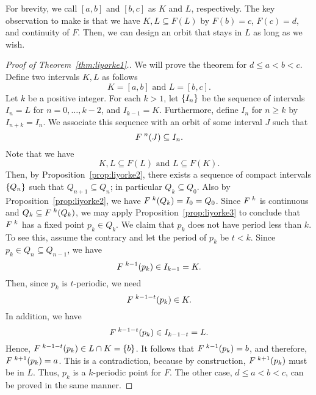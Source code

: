 \documentclass[10pt,draft,twoside]{book}
\begin{document}
For brevity, we call $[a,b]$ and $[b,c]$ as $K$ and $L$, respectively.
The key observation to make is that we have $K,L \subseteq F(L)$ by $F(b) = c$, $F(c) = d$, and continuity of $F$.
Then, we can design an orbit that stays in $L$ as long as we wish.
\begin{proof}[Proof of Theorem~\ref{thm:liyorke1}.]
  We will prove the theorem for $d \leq a < b < c$.
  Define two intervals $K,L$ as follows
  \begin{equation*}
    K = [a,b] \mbox{ and } L = [b,c].
  \end{equation*}
  Let $k$ be a positive integer.
  For each $k > 1$, let $\left \{ I_n \right \}$ be the sequence of intervals $I_n = L$ for $n = 0, \ldots, k-2$, and $I_{k-1} = K$.
  Furthermore, define $I_n$ for $n \geq k$ by $I_{n+k} = I_n$.
  We associate this sequence with an orbit of some interval $J$ such that
  \begin{equation*}
    F^{\;n}(J) \subseteq I_n.
  \end{equation*}
  Note that we have 
  \begin{equation*}
    K,L \subseteq F(L) \mbox{ and } L \subseteq F(K).
  \end{equation*}
  Then, by Proposition~\ref{prop:liyorke2}, there exists a sequence of compact intervals $\left \{ Q_n \right \}$ such that $Q_{n+1} \subseteq Q_{n}$; in particular $Q_k \subseteq Q_0$.
  Also by Proposition~\ref{prop:liyorke2}, we have $F^{\;k}(Q_k) = I_0 = Q_0$.
  Since $F^{\;k}$ is continuous and $Q_k \subseteq F^{\;k}(Q_k)$, we may apply Proposition~\ref{prop:liyorke3} to conclude that $F^{\;k}$ has a fixed point $p_k \in Q_k$.
  We claim that $p_k$ does not have period less than $k$.
  To see this, assume the contrary and let the period of $p_k$ be $t < k$.
  Since $p_k \in Q_n \subseteq Q_{n-1}$, we have 
  \begin{equation*}
    F^{\;k-1}(p_k) \in I_{k-1} = K.
  \end{equation*}
  Then, since $p_k$ is $t$-periodic, we need 
  \begin{equation*}
    F^{\;k-1-t}(p_k) \in K.
  \end{equation*}
  In addition, we have
  \begin{equation*}
    F^{\;k-1-t}(p_k) \in I_{k-1-t} = L.
  \end{equation*}
  Hence, $F^{\;k-1-t}(p_k) \in L \cap K = \left \{ b \right \}$.
  It follows that $F^{\;k-1}(p_k) = b$, and therefore, $F^{\;k+1}(p_k) = a$.
  This is a contradiction, because by construction, $F^{\;k+1}(p_k)$ must be in $L$.
  Thus, $p_k$ is a $k$-periodic point for $F$.
  The other case, $d \leq a < b < c$, can be proved in the same manner.
\end{proof}
\end{document}
